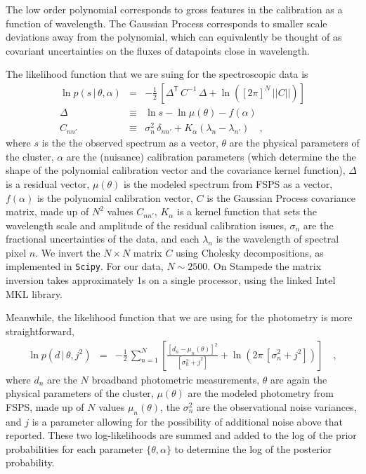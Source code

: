 \documentclass[11pt,preprint]{aastex}
\newcommand{\transpose}[1]{{#1}^{\!\mathsf T}}
\newcommand{\given}{\,|\,}
\renewcommand{\det}[1]{||{#1}||}
\begin{document}
The low order polynomial corresponds to gross features in the calibration as a function of wavelength.
The Gaussian Process corresponds to smaller scale deviations away from the polynomial, which can equivalently be thought of as covariant uncertainties on the fluxes of datapoints close in wavelength.

The likelihood function that we are suing for the spectroscopic data is 
\begin{eqnarray}\label{eq:spectroscopicLF}
\ln p(s\given\theta,\alpha) &=& -\frac{1}{2}\,\left[\transpose{\Delta}\,C^{-1}\,\Delta + \ln([2\pi]^N\,\det{C}) \right]
\\
\Delta &\equiv& \ln s - \ln \mu(\theta) - f(\alpha) 
\\
C_{nn'} &\equiv& \sigma_n^2 \,\delta_{nn'} +
K_\alpha(\lambda_n - \lambda_{n'})
\quad ,
\end{eqnarray}
where $s$ is the the observed spectrum as a vector,
$\theta$ are the physical parameters of the cluster,
$\alpha$ are the (nuisance) calibration parameters
(which determine the the shape of the polynomial calibration vector and the covariance kernel function),
$\Delta$ is a residual vector,
$\mu(\theta)$ is the modeled spectrum from FSPS as a vector,
$f(\alpha)$ is the polynomial calibration vector,
$C$ is the Gaussian Process covariance matrix,
made up of $N^2$ values $C_{nn'}$,
$K_\alpha$ is a kernel function that sets the wavelength scale and
amplitude of the residual calibration issues,
$\sigma_n$ are the fractional uncertainties of the data,
and each $\lambda_n$ is the wavelength of spectral pixel $n$.
We invert the $N \times N$ matrix $C$ using Cholesky decompositions, as implemented in \texttt{Scipy}. 
For our data, $N\sim 2500$.  
On Stampede the matrix inversion takes approximately 1s on a single processor, using the linked Intel MKL library.

Meanwhile, the likelihood function that we are using for the photometry is more straightforward, 
\begin{eqnarray}\label{eq:photometricLF}
\ln p(d\given\theta,j^2) &=& -\frac{1}{2}\,\sum_{n=1}^N \left[\frac{[d_n - \mu_n(\theta)]^2}{[\sigma_n^2 + j^2]} + \ln(2\pi\,[\sigma_n^2 + j^2]) \right]
\quad ,
\end{eqnarray}
where $d_n$ are the $N$ broadband photometric measurements,
$\theta$ are again the physical parameters of the cluster,
$\mu(\theta)$ are the modeled photometry from FSPS,
made up of $N$ values $\mu_n(\theta)$,
the $\sigma_n^2$ are the observational noise variances,
and $j$ is a parameter allowing for the possibility of additional noise above that reported.
These two log-likelihoods are summed and added to the log of the prior probabilities for each parameter $\{\theta, \alpha\}$ to determine the log of the posterior probability.
\end{document}
